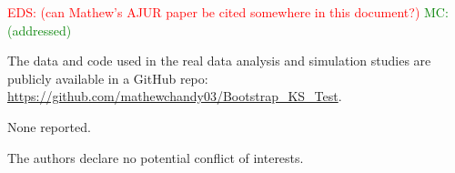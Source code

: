 \documentclass[APA,Times1COL]{WileyNJDv5} %
\newcommand{\eds}[1]{\textcolor{red}{EDS: (#1)}}
\newcommand{\mc}[1]{\textcolor{green}{MC: (#1)}}
\begin{document}
\eds{can Mathew's AJUR paper be cited somewhere in this document?}
\mc{addressed}


The data and code used in the real data analysis and simulation
studies are publicly available in a GitHub repo:
\url{https://github.com/mathewchandy03/Bootstrap_KS_Test}.



None reported.


The authors declare no potential conflict of interests.








\end{document}
